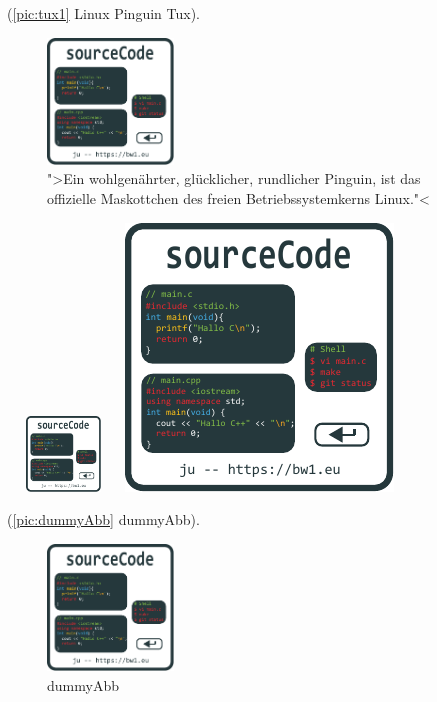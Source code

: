 (\autoref{pic:tux1} Linux Pinguin Tux).
\begin{figure}[!hb] %
	\centering
  \includegraphics[width=0.3\textwidth]{img/logo.pdf}
	\caption[Tux]{">Ein wohlgenährter, glücklicher, rundlicher Pinguin, ist das
									offizielle Maskottchen des freien Betriebssystemkerns Linux."<
	}%
	\label{pic:tux1}%
\end{figure}

\includegraphics[height=2cm,width=3cm]{img/logo.pdf}
\includegraphics[angle=45, scale=.2]{img/logo.pdf}

(\autoref{pic:dummyAbb} dummyAbb).    %
\begin{figure}[!hb]%
	\centering
  \includegraphics[width=0.3\textwidth]{img/logo.pdf}
	\caption{dummyAbb}%
	\label{pic:dummyAbb}%
\end{figure}

